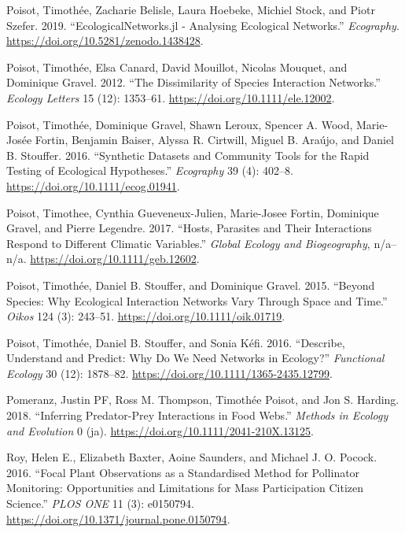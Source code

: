 \documentclass[11pt]{article}
\begin{document}
\leavevmode\hypertarget{ref-PoisBeli19}{}%
Poisot, Timothée, Zacharie Belisle, Laura Hoebeke, Michiel Stock, and
Piotr Szefer. 2019. ``EcologicalNetworks.jl - Analysing Ecological
Networks.'' \emph{Ecography}.
\url{https://doi.org/10.5281/zenodo.1438428}.

\leavevmode\hypertarget{ref-PoisCana12}{}%
Poisot, Timothée, Elsa Canard, David Mouillot, Nicolas Mouquet, and
Dominique Gravel. 2012. ``The Dissimilarity of Species Interaction
Networks.'' \emph{Ecology Letters} 15 (12): 1353--61.
\url{https://doi.org/10.1111/ele.12002}.

\leavevmode\hypertarget{ref-PoisGrav16}{}%
Poisot, Timothée, Dominique Gravel, Shawn Leroux, Spencer A. Wood,
Marie-Josée Fortin, Benjamin Baiser, Alyssa R. Cirtwill, Miguel B.
Araújo, and Daniel B. Stouffer. 2016. ``Synthetic Datasets and Community
Tools for the Rapid Testing of Ecological Hypotheses.'' \emph{Ecography}
39 (4): 402--8. \url{https://doi.org/10.1111/ecog.01941}.

\leavevmode\hypertarget{ref-PoisGuev17}{}%
Poisot, Timothee, Cynthia Gueveneux-Julien, Marie-Josee Fortin,
Dominique Gravel, and Pierre Legendre. 2017. ``Hosts, Parasites and
Their Interactions Respond to Different Climatic Variables.''
\emph{Global Ecology and Biogeography}, n/a--n/a.
\url{https://doi.org/10.1111/geb.12602}.

\leavevmode\hypertarget{ref-PoisStou15}{}%
Poisot, Timothée, Daniel B. Stouffer, and Dominique Gravel. 2015.
``Beyond Species: Why Ecological Interaction Networks Vary Through Space
and Time.'' \emph{Oikos} 124 (3): 243--51.
\url{https://doi.org/10.1111/oik.01719}.

\leavevmode\hypertarget{ref-PoisStou16}{}%
Poisot, Timothée, Daniel B. Stouffer, and Sonia Kéfi. 2016. ``Describe,
Understand and Predict: Why Do We Need Networks in Ecology?''
\emph{Functional Ecology} 30 (12): 1878--82.
\url{https://doi.org/10.1111/1365-2435.12799}.

\leavevmode\hypertarget{ref-PomeThom18}{}%
Pomeranz, Justin PF, Ross M. Thompson, Timothée Poisot, and Jon S.
Harding. 2018. ``Inferring Predator-Prey Interactions in Food Webs.''
\emph{Methods in Ecology and Evolution} 0 (ja).
\url{https://doi.org/10.1111/2041-210X.13125}.

\leavevmode\hypertarget{ref-RoyBaxt16}{}%
Roy, Helen E., Elizabeth Baxter, Aoine Saunders, and Michael J. O.
Pocock. 2016. ``Focal Plant Observations as a Standardised Method for
Pollinator Monitoring: Opportunities and Limitations for Mass
Participation Citizen Science.'' \emph{PLOS ONE} 11 (3): e0150794.
\url{https://doi.org/10.1371/journal.pone.0150794}.
\end{document}
